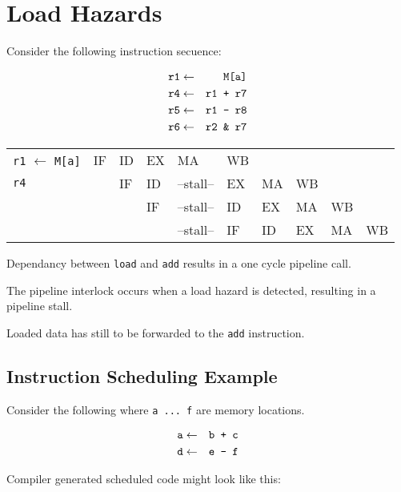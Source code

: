 \documentclass[a4paper,12pt]{article}
\begin{document}
\section*{Load Hazards}

Consider the following instruction secuence:

\begin{eqnarray*}
\verb!r1! 	& 	\leftarrow 	&	\verb!M[a]! 	\\
\verb!r4! 	& 	\leftarrow	&	\verb!r1 + r7! \\
\verb!r5!	&	\leftarrow	&	\verb!r1 - r8! \\
\verb!r6!	&	\leftarrow	&	\verb!r2 & r7!	\\
\end{eqnarray*}

\begin{tabular}{l|l|l|l|l|l|l|l|l|l}
\verb!r1! $\leftarrow$ \verb!M[a]!	& IF	& ID	& EX	& MA			& WB	& 		&		&		&	\\
\verb!r4!									&		& IF	& ID	& --stall--	& EX	& MA	& WB	&		&	\\
												&		&		& IF	& --stall-- & ID	& EX	& MA	& WB	&	\\
												&		&		&		& --stall--	& IF	& ID	& EX	& MA	& WB \\
\end{tabular}

Dependancy between \verb!load! and \verb!add! results in a one cycle
pipeline call.


The pipeline interlock occurs when a load hazard is detected, resulting
in a pipeline stall.

Loaded data has still to be forwarded to the \verb!add! instruction.


\subsection*{Instruction Scheduling Example}

Consider the following where \verb!a ... f! are memory locations.

\begin{eqnarray*}
\verb!a!	& 	\leftarrow 	&	\verb!b + c! \\
\verb!d! &	\leftarrow	&	\verb!e - f! \\
\end{eqnarray*}

Compiler generated scheduled code might look like this:
\end{document}
